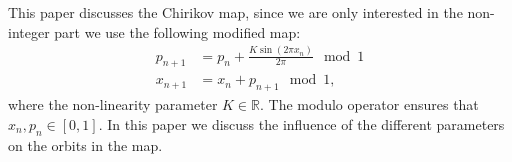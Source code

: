 This paper discusses the Chirikov map, since we are only interested in the non-integer part we use the following modified map:
\begin{subequations}\label{eq:chirikov}
	\begin{align}
		\label{eq:chirikov:p} p_{n + 1} &= p_n + \frac{K \sin \left(  2 \pi x_n \right)}{2 \pi} \mod 1 \\
		\label{eq:chirikov:x} x_{n + 1} &= x_n + p_{n + 1} \mod 1,
	\end{align}
\end{subequations}	
where the non-linearity parameter $K \in \mathbb{R}$. The modulo operator ensures that $x_n, p_n \in \left[ 0, 1 \right]$. In this paper we discuss the influence of the different parameters on the orbits in the map.